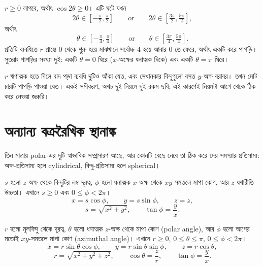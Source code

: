 \documentclass[11pt]{article}
\begin{document}
\begin{sol}
$r \geq 0$ লাগবে, অর্থাৎ $\cos 2\theta \geq 0$। এটি ঘটে যখন
\[
  2\theta \in \left[ -\tfrac{\pi}{2}, \tfrac{\pi}{2} \right]
  \qquad \text{or} \qquad
  2\theta \in \left[ \tfrac{3\pi}{2}, \tfrac{5\pi}{2} \right] ,
\]
অর্থাৎ
\[
  \theta \in \left[ -\tfrac{\pi}{4}, \tfrac{\pi}{4} \right]
  \qquad \text{or} \qquad
  \theta \in \left[ \tfrac{3\pi}{4}, \tfrac{5\pi}{4} \right] .
\]
প্রতিটি ব্যবধিতে $r$ প্রান্তে $0$ থেকে শুরু হয়ে মাঝখানে সর্বোচ্চ $4$ হয়ে আবার
$0$-তে ফেরে, অর্থাৎ একটি করে পাপড়ি। সুতরাং পাপড়ির সংখ্যা দুই: একটি
$\theta = 0$ ঘিরে ($x$-অক্ষের ধনাত্মক দিকে) এবং একটি $\theta = \pi$ ঘিরে।

$r$ ঋণাত্মক হতে দিলে বাদ পড়া ব্যবধি দুটিও আঁকা যেত, এবং সেখানকার বিন্দুগুলো
বসত $y$-অক্ষ বরাবর। তখন মোট চারটি পাপড়ি পাওয়া যেত। একই সমীকরণ, অথচ দুই নিয়মে
দুই রকম ছবি; এই কারণেই নিয়মটা আগে থেকে ঠিক করে নেওয়া জরুরি।
\end{sol}

\section{অন্যান্য বক্ররৈখিক স্থানাঙ্ক}

তিন মাত্রায় polar-এর দুটি স্বাভাবিক সম্প্রসারণ আছে, আর কোনটি বেছে নেবে তা ঠিক
করে দেয় সমস্যার প্রতিসাম্য: অক্ষ-প্রতিসাম্য হলে cylindrical, বিন্দু-প্রতিসাম্য
হলে spherical।

\begin{idea}
$s$ হলো $z$-অক্ষ থেকে বিন্দুটির লম্ব দূরত্ব, $\phi$ হলো ধনাত্মক $x$-অক্ষ থেকে
$xy$-সমতলে মাপা কোণ, আর $z$ যথারীতি উচ্চতা। এখানে $s \geq 0$ এবং
$0 \leq \phi < 2\pi$।
\[
  x = s\cos\phi, \qquad y = s\sin\phi, \qquad z = z ,
\]
\[
  s = \sqrt{x^{2}+y^{2}}, \qquad \tan\phi = \frac{y}{x} .
\]
\end{idea}

\begin{idea}
$r$ হলো মূলবিন্দু থেকে দূরত্ব, $\theta$ হলো ধনাত্মক $z$-অক্ষ থেকে মাপা কোণ
(polar angle), আর $\phi$ হলো আগের মতোই $xy$-সমতলে মাপা কোণ (azimuthal angle)।
এখানে $r \geq 0$, $0 \leq \theta \leq \pi$, $0 \leq \phi < 2\pi$।
\[
  x = r\sin\theta\cos\phi, \qquad
  y = r\sin\theta\sin\phi, \qquad
  z = r\cos\theta ,
\]
\[
  r = \sqrt{x^{2}+y^{2}+z^{2}}, \qquad
  \cos\theta = \frac{z}{r}, \qquad
  \tan\phi = \frac{y}{x} .
\]
\end{idea}
\end{document}
